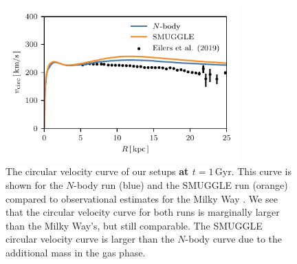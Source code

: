 \documentclass[twocolumn,linenumbers,trackchanges]{aastex631}
\newcommand{\Nbody}{$N$-body}
\newcommand{\SMUGGLE}{SMUGGLE}
\begin{document}
\begin{figure}
    \centering
    \includegraphics[width=9cm]{fig/vcirc.pdf}
    \caption{The circular velocity curve of our setups {\bf at $t=1\,\textrm{Gyr}$}.
    This curve is shown for the \Nbody{} run (blue) and the \SMUGGLE{} run
    (orange) compared to observational estimates for the Milky Way
    \citep{2019ApJ...871..120E}. We see that the circular velocity curve for
    both runs is marginally larger than the Milky Way's, but still comparable.
    The \SMUGGLE{} circular velocity curve is larger than the \Nbody{} curve due
    to the additional mass in the gas phase.}
    \label{fig:vcirc}
\end{figure}



{}



\end{document}
